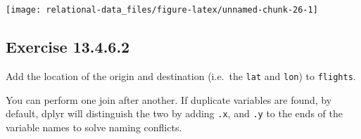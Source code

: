 \documentclass[]{book}
\newenvironment{Shaded}{\begin{snugshade}}{\end{snugshade}}
\newcommand{\CommentTok}[1]{\textcolor[rgb]{0.56,0.35,0.01}{\textit{#1}}}
\newcommand{\DataTypeTok}[1]{\textcolor[rgb]{0.13,0.29,0.53}{#1}}
\newcommand{\KeywordTok}[1]{\textcolor[rgb]{0.13,0.29,0.53}{\textbf{#1}}}
\newcommand{\NormalTok}[1]{#1}
\newcommand{\OperatorTok}[1]{\textcolor[rgb]{0.81,0.36,0.00}{\textbf{#1}}}
\newcommand{\OtherTok}[1]{\textcolor[rgb]{0.56,0.35,0.01}{#1}}
\newcommand{\StringTok}[1]{\textcolor[rgb]{0.31,0.60,0.02}{#1}}
\theoremstyle{plain}
\theoremstyle{remark}
\begin{document}
\begin{Shaded}
\end{Shaded}

\begin{Shaded}
\end{Shaded}

\begin{center}\texttt{[image: relational-data\_files/figure-latex/unnamed-chunk-26-1]} \end{center}

\hypertarget{exercise-13.4.6.2}{%
\subsection*{\texorpdfstring{Exercise {13.4.6.2}}{Exercise 13.4.6.2}}\label{exercise-13.4.6.2}}

Add the location of the origin and destination (i.e.~the \texttt{lat} and \texttt{lon}) to \texttt{flights}.

You can perform one join after another. If duplicate variables are found, by default, dplyr will distinguish the two by adding \texttt{.x}, and \texttt{.y} to the ends of the variable names to solve naming conflicts.
\end{document}
